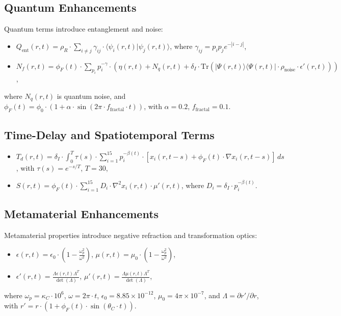 \documentclass{article}
\theoremstyle{plain}
\begin{document}
\subsection{Quantum Enhancements}
Quantum terms introduce entanglement and noise:
\begin{itemize}
    \item \( Q_{\text{ent}}(r,t) = \rho_R \cdot \sum_{i \neq j} \gamma_{ij} \cdot \langle \psi_i(r,t) | \psi_j(r,t) \rangle \), where \(\gamma_{ij} = p_i p_j e^{-|i-j|}\),
    \item \( N_f(r,t) = \phi_F(t) \cdot \sum_{p_i} p_i^{-\gamma} \cdot (\eta(r,t) + N_q(r,t) + \delta_I \cdot \text{Tr}(|\Psi(r,t)\rangle \langle \Psi(r,t)| \cdot \rho_{\text{noise}} \cdot \epsilon'(r,t))) \),
\end{itemize}
where \( N_q(r,t) \) is quantum noise, and \( \phi_F(t) = \phi_0 \cdot (1 + \alpha \cdot \sin(2\pi \cdot f_{\text{fractal}} \cdot t)) \), with \(\alpha = 0.2\), \(f_{\text{fractal}} = 0.1\).

\subsection{Time-Delay and Spatiotemporal Terms}
\begin{itemize}
    \item \( T_d(r,t) = \delta_I \cdot \int_0^T \tau(s) \cdot \sum_{i=1}^{15} p_i^{-\beta(t)} \cdot [x_i(r,t - s) + \phi_F(t) \cdot \nabla x_i(r,t - s)] \, ds \), with \(\tau(s) = e^{-s/T}\), \(T = 30\),
    \item \( S(r,t) = \phi_F(t) \cdot \sum_{i=1}^{15} D_i \cdot \nabla^2 x_i(r,t) \cdot \mu'(r,t) \), where \(D_i = \delta_I \cdot p_i^{-\beta(t)}\).
\end{itemize}

\subsection{Metamaterial Enhancements}
Metamaterial properties introduce negative refraction and transformation optics:
\begin{itemize}
    \item \( \epsilon(r,t) = \epsilon_0 \cdot \left(1 - \frac{\omega_p^2}{\omega^2}\right) \), \( \mu(r,t) = \mu_0 \cdot \left(1 - \frac{\omega_p^2}{\omega^2}\right) \),
    \item \( \epsilon'(r,t) = \frac{\Lambda \epsilon(r,t) \Lambda^T}{\det(\Lambda)} \), \( \mu'(r,t) = \frac{\Lambda \mu(r,t) \Lambda^T}{\det(\Lambda)} \),
\end{itemize}
where \(\omega_p = \kappa_C \cdot 10^6\), \(\omega = 2\pi \cdot t\), \(\epsilon_0 = 8.85 \times 10^{-12}\), \(\mu_0 = 4\pi \times 10^{-7}\), and \(\Lambda = \partial r' / \partial r\), with \(r' = r \cdot (1 + \phi_F(t) \cdot \sin(\theta_C \cdot t))\).
\end{document}
